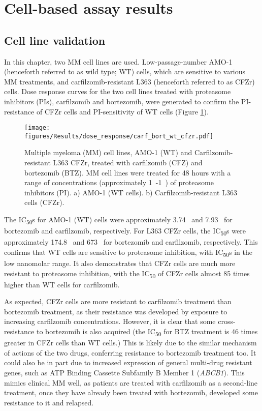 \section{Cell-based assay results}
\subsection{Cell line validation}
In this chapter, two MM cell lines are used.
Low-passage-number AMO-1 (henceforth referred to as wild type; WT) cells, which are sensitive to various MM treatments, and carfilzomib-resistant L363 (henceforth referred to as CFZr) cells.
Dose response curves for the two cell lines treated with proteasome inhibitors (PIs), carfilzomib and bortezomib, were generated to confirm the PI-resistance of CFZr cells and PI-sensitivity of WT cells (Figure \ref{fig:dose_carf_bort}).
\begin{figure}[h]
\centering
\texttt{[image: figures/Results/dose\_response/carf\_bort\_wt\_cfzr.pdf]}
\caption[Carfilzomib and bortezomib dose response curves]{Multiple myeloma (MM) cell lines, AMO-1 (WT) and Carfilzomib-resistant L363 CFZr, treated with carfilzomib (CFZ) and bortezomib (BTZ).
MM cell lines were treated for 48 hours with a range of concentrations (approximately 1\si{\nano\Molar}-1\si{\micro\Molar}) of proteasome inhibitors (PI).
a) AMO-1 (WT cells).
b) Carfilzomib-resistant L363 cells (CFZr).}
\label{fig:dose_carf_bort}
\end{figure}
The IC\textsubscript{50}s for AMO-1 (WT) cells were approximately 3.74\si{\nano\Molar} and 7.93\si{\nano\Molar} for bortezomib and carfilzomib, respectively.
For L363 CFZr cells, the IC\textsubscript{50}s were approximately 174.8\si{\nano\Molar} and 673\si{\nano\Molar} for bortezomib and carfilzomib, respectively.
This confirms that WT cells are sensitive to proteasome inhibition, with IC\textsubscript{50}s in the low nanomolar range.
It also demonstrates that CFZr cells are much more resistant to proteasome inhibition, with the IC\textsubscript{50} of CFZr cells almost 85 times higher than WT cells for carfilzomib.

As expected, CFZr cells are more resistant to carfilzomib treatment than bortezomib treatment, as their resistance was developed by exposure to increasing carfilzomib concentrations.
However, it is clear that some cross-resistance to bortezomib is also acquired (the IC\textsubscript{50} for BTZ treatment is 46 times greater in CFZr cells than WT cells.)
This is likely due to the similar mechanism of actions of the two drugs, conferring resistance to bortezomib treatment too.
It could also be in part due to increased expression of general multi-drug resistant genes, such as ATP Binding Cassette Subfamily B Member 1 (\textit{ABCB1}).
This mimics clinical MM well, as patients are treated with carfilzomib as a second-line treatment, once they have already been treated with bortezomib, developed some resistance to it and relapsed.


